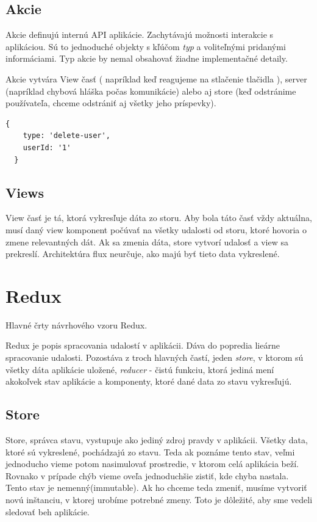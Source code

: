 \subsection{Akcie}
Akcie definujú internú API aplikácie. Zachytávajú možnosti interakcie s aplikáciou. Sú to jednoduché objekty s kľúčom \emph{typ} a voliteľnými pridanými informáciami. Typ akcie by nemal obsahovať žiadne implementačné detaily.

Akcie vytvára View časť ( napríklad keď reagujeme na stlačenie tlačidla ), %
server (napríklad chybová hláška počas komunikácie) %
alebo aj store (keď odstránime používateľa, chceme odstrániť aj všetky jeho príspevky).

\begin{lstlisting}[caption=Akcia vo Flux architektúre]
  {
  	type: 'delete-user',
  	userId: '1'
  }
\end{lstlisting}

\subsection{Views}%
View časť je tá, ktorá vykresľuje dáta zo storu. Aby bola táto časť vždy aktuálna, musí daný view komponent počúvať na všetky udalosti od storu, ktoré hovoria o zmene relevantných dát. Ak sa zmenia dáta, store vytvorí udalosť a view sa prekreslí. Architektúra flux neurčuje, ako majú byť tieto data vykreslené.






\section{Redux}
Hlavné črty návrhového vzoru Redux. 

Redux je popis spracovania udalostí v aplikácii. Dáva do popredia lieárne spracovanie udalosti. Pozostáva z troch hlavných častí, jeden \emph{store}, v ktorom sú všetky dáta aplikácie uložené, \emph{reducer} - čistú funkciu, ktorá jediná mení akokoľvek stav aplikácie a komponenty, ktoré dané data zo stavu vykresľujú.


\subsection{Store}
Store, správca stavu, vystupuje ako jediný zdroj pravdy v aplikácii. Všetky data, ktoré sú vykreslené, pochádzajú zo stavu. Teda ak poznáme tento stav, veľmi jednoducho vieme potom nasimulovať prostredie, v ktorom celá aplikácia beží. Rovnako v prípade chýb vieme oveľa jednoduchšie zistiť, kde chyba nastala. Tento stav je nemenný(immutable). Ak ho chceme teda zmeniť, musíme vytvoriť novú inštanciu, v ktorej urobíme potrebné zmeny. Toto je dôležité, aby sme vedeli sledovať beh aplikácie.

